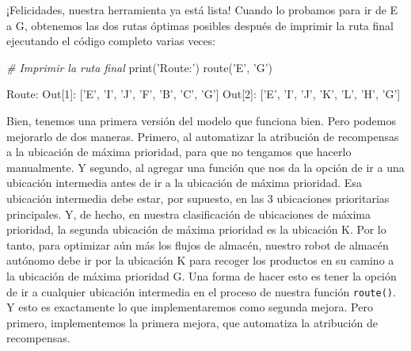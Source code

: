 \documentclass[]{book}
\newenvironment{Shaded}{\begin{snugshade}}{\end{snugshade}}
\newcommand{\BuiltInTok}[1]{#1}
\newcommand{\CommentTok}[1]{\textcolor[rgb]{0.56,0.35,0.01}{\textit{#1}}}
\newcommand{\DecValTok}[1]{\textcolor[rgb]{0.00,0.00,0.81}{#1}}
\newcommand{\NormalTok}[1]{#1}
\newcommand{\StringTok}[1]{\textcolor[rgb]{0.31,0.60,0.02}{#1}}
\begin{document}
¡Felicidades, nuestra herramienta ya está lista! Cuando lo probamos para ir de E a G, obtenemos las dos rutas óptimas posibles después de imprimir la ruta final ejecutando el código completo varias veces:

\begin{Shaded}
\begin{Highlighting}[]
\CommentTok{# Imprimir la ruta final}
\BuiltInTok{print}\NormalTok{(}\StringTok{'Route:'}\NormalTok{)}
\NormalTok{route(}\StringTok{'E'}\NormalTok{, }\StringTok{'G'}\NormalTok{)}
\end{Highlighting}
\end{Shaded}

\begin{Shaded}
\begin{Highlighting}[]
\NormalTok{Route:}
\NormalTok{Out[}\DecValTok{1}\NormalTok{]: [}\StringTok{'E'}\NormalTok{, }\StringTok{'I'}\NormalTok{, }\StringTok{'J'}\NormalTok{, }\StringTok{'F'}\NormalTok{, }\StringTok{'B'}\NormalTok{, }\StringTok{'C'}\NormalTok{, }\StringTok{'G'}\NormalTok{]}
\NormalTok{Out[}\DecValTok{2}\NormalTok{]: [}\StringTok{'E'}\NormalTok{, }\StringTok{'I'}\NormalTok{, }\StringTok{'J'}\NormalTok{, }\StringTok{'K'}\NormalTok{, }\StringTok{'L'}\NormalTok{, }\StringTok{'H'}\NormalTok{, }\StringTok{'G'}\NormalTok{]}
\end{Highlighting}
\end{Shaded}

Bien, tenemos una primera versión del modelo que funciona bien. Pero podemos mejorarlo de dos maneras. Primero, al automatizar la atribución de recompensas a la ubicación de máxima prioridad, para que no tengamos que hacerlo manualmente. Y segundo, al agregar una función que nos da la opción de ir a una ubicación intermedia antes de ir a la ubicación de máxima prioridad. Esa ubicación intermedia debe estar, por supuesto, en las 3 ubicaciones prioritarias principales. Y, de hecho, en nuestra clasificación de ubicaciones de máxima prioridad, la segunda ubicación de máxima prioridad es la ubicación K. Por lo tanto, para optimizar aún más los flujos de almacén, nuestro robot de almacén autónomo debe ir por la ubicación K para recoger los productos en su camino a la ubicación de máxima prioridad G. Una forma de hacer esto es tener la opción de ir a cualquier ubicación intermedia en el proceso de nuestra función \texttt{route()}. Y esto es exactamente lo que implementaremos como segunda mejora. Pero primero, implementemos la primera mejora, que automatiza la atribución de recompensas.
\end{document}
